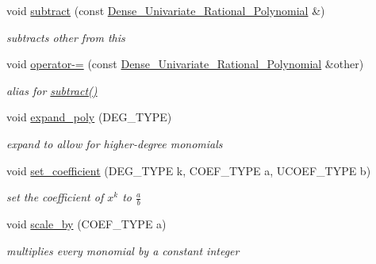 \begin{Indent}
\begin{DoxyCompactItemize}
\mbox{\label{group__polygroup_aab4902fd7521146ea739f9f3f8c0c8b6}} 
void \hyperlink{group__polygroup_aab4902fd7521146ea739f9f3f8c0c8b6}{subtract} (const \hyperlink{group__polygroup_class_dense___univariate___rational___polynomial}{Dense\+\_\+\+Univariate\+\_\+\+Rational\+\_\+\+Polynomial} \&)
\begin{DoxyCompactList}\small\item\em subtracts {\ttfamily other} from {\ttfamily this} \end{DoxyCompactList}\item 
\mbox{\label{group__polygroup_a7bb6d8ed216e5575773013a19052e79c}} 
void \hyperlink{group__polygroup_a7bb6d8ed216e5575773013a19052e79c}{operator-\/=} (const \hyperlink{group__polygroup_class_dense___univariate___rational___polynomial}{Dense\+\_\+\+Univariate\+\_\+\+Rational\+\_\+\+Polynomial} \&other)
\begin{DoxyCompactList}\small\item\em alias for \hyperlink{group__polygroup_aab4902fd7521146ea739f9f3f8c0c8b6}{subtract()} \end{DoxyCompactList}\item 
void \hyperlink{group__polygroup_a57f7bbe1cd7ae1c2ca66d12f988a9c6d}{expand\+\_\+poly} (D\+E\+G\+\_\+\+T\+Y\+PE)
\begin{DoxyCompactList}\small\item\em expand to allow for higher-\/degree monomials \end{DoxyCompactList}\item 
\mbox{\label{group__polygroup_a382347b9ae8adcc72c7787b0a737fbbf}} 
void \hyperlink{group__polygroup_a382347b9ae8adcc72c7787b0a737fbbf}{set\+\_\+coefficient} (D\+E\+G\+\_\+\+T\+Y\+PE k, C\+O\+E\+F\+\_\+\+T\+Y\+PE a, U\+C\+O\+E\+F\+\_\+\+T\+Y\+PE b)
\begin{DoxyCompactList}\small\item\em set the coefficient of $x^k$ to $\frac{a}{b}$ \end{DoxyCompactList}\item 
\mbox{\label{group__polygroup_accb38470c561da8878937486c9c3c4e7}} 
void \hyperlink{group__polygroup_accb38470c561da8878937486c9c3c4e7}{scale\+\_\+by} (C\+O\+E\+F\+\_\+\+T\+Y\+PE a)
\begin{DoxyCompactList}\small\item\em multiplies every monomial by a constant integer \end{DoxyCompactList}\item 

\end{DoxyCompactItemize}
\end{Indent}
